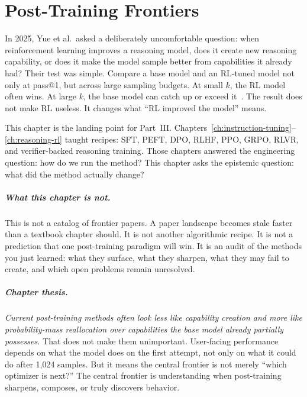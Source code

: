 \chapter{Post-Training Frontiers}
\label{ch:frontiers}
\raggedbottom

In 2025, Yue et al.\ asked a deliberately uncomfortable question: when reinforcement learning improves a reasoning model, does it create new reasoning capability, or does it make the model sample better from capabilities it already had? Their test was simple. Compare a base model and an RL-tuned model not only at pass@1, but across large sampling budgets. At small $k$, the RL model often wins. At large $k$, the base model can catch up or exceed it~\cite{yue2025rlreasoning}. The result does not make RL useless. It changes what ``RL improved the model'' means.

This chapter is the landing point for Part~III. Chapters~\ref{ch:instruction-tuning}--\ref{ch:reasoning-rl} taught recipes: SFT, PEFT, DPO, RLHF, PPO, GRPO, RLVR, and verifier-backed reasoning training. Those chapters answered the engineering question: how do we run the method? This chapter asks the epistemic question: what did the method actually change?

\paragraph{What this chapter is not.} This is not a catalog of frontier papers. A paper landscape becomes stale faster than a textbook chapter should. It is not another algorithmic recipe. It is not a prediction that one post-training paradigm will win. It is an audit of the methods you just learned: what they surface, what they sharpen, what they may fail to create, and which open problems remain unresolved.

\paragraph{Chapter thesis.} \emph{Current post-training methods often look less like capability creation and more like probability-mass reallocation over capabilities the base model already partially possesses.} That does not make them unimportant. User-facing performance depends on what the model does on the first attempt, not only on what it could do after 1{,}024 samples. But it means the central frontier is not merely ``which optimizer is next?'' The central frontier is understanding when post-training sharpens, composes, or truly discovers behavior.

